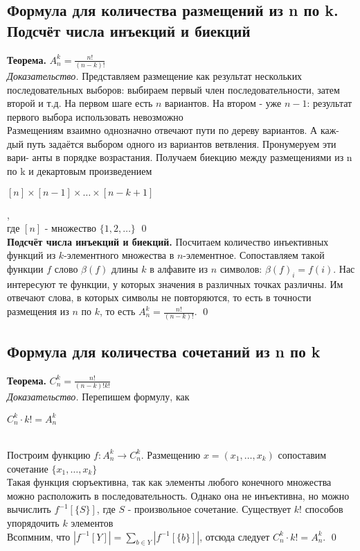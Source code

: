 \documentclass[a4paper]{article}
\begin{document}
\subsection{Формула для количества размещений из n по k. Подсчёт числа инъекций и биекций}
\textbf{Теорема.} $A^k_n=\frac{n!}{(n-k)!}$\\[2mm]
\textit{Доказательство.} Представляем размещение как результат нескольких последовательных выборов: выбираем первый член последовательности, затем второй и т.д. На первом шаге есть $n$ вариантов. На втором - уже $n-1$: результат первого выбора использовать невозможно\\[2mm]
 Размещениям взаимно однозначно отвечают пути по дереву вариантов. А каж- дый путь задаётся выбором одного из вариантов ветвления. Пронумеруем эти вари- анты в порядке возрастания. Получаем биекцию между размещениями из n по k и декартовым произведением\\[2mm]
\centerline{$[n]\times[n-1]\times\ldots\times[n-k+1]$},\\[2mm]
где $[n]$ - множество $\{1,2,\ldots\}$ \qed\\[2mm]
\textbf{Подсчёт числа инъекций и биекций.} Посчитаем количество инъективных функций из $k$-элементного множества в $n$-элементное. Сопоставляем такой функции $f$ слово $\beta(f)$ длины $k$ в алфавите из $n$ символов: $\beta(f)_i=f(i)$. Нас интересуют те функции, у которых значения в различных точках различны. Им отвечают слова, в которых символы не повторяются, то есть в точности размещения из $n$ по $k$, то есть $A^k_n=\frac{n!}{(n-k)!}$. \qed
\subsection{Формула для количества сочетаний из n по k}
\textbf{Теорема.} $C_n^k=\frac{n!}{(n-k)!k!}$\\[2mm]
\textit{Доказательство.} Перепишем формулу, как\\
\centerline{$C_n^k\cdot k!=A_n^k$}\\
 Построим функцию $f: A_n^k\rightarrow C_n^k$. Размещению $x=(x_1,\ldots,x_k)$ сопоставим сочетание $\{x_1,\ldots,x_k\}$\\[2mm]
 Такая функция сюръективна, так как элементы любого конечного множества можно расположить в последовательность. Однако она не инъективна, но можно вычислить $f^{-1}[\{S\}]$, где $S$ - произвольное сочетание. Существует $k!$ способов упорядочить $k$ элементов\\[2mm]
 Всопмним, что $|f^{-1}[Y]|=\sum\limits_{b\in Y} |f^{-1}[\{b\}]|$, отсюда следует $C_n^k\cdot k!=A_n^k$. \qed
\end{document}
